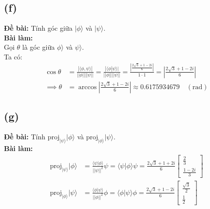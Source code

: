 \subsection{(f)}
\textbf{Đề bài:} Tính góc giữa $|\phi\rangle$ và $|\psi\rangle$.\\
\textbf{Bài làm:}\\
Gọi $\theta$ là góc giữa $\phi\rangle$ và $\psi\rangle$.\\
Ta có:
\begin{align*}
    \cos\theta &= \frac{|\langle\phi, \psi\rangle|}{||\phi||||\psi||}
    = \frac{|\langle\phi|\psi\rangle|}{||\phi||||\psi||}
    = \frac{\left|\frac{2\sqrt{3} + 1 - 2i}{6}\right|}{1 \cdot 1}
    = \left|\frac{2\sqrt{3} + 1 - 2i}{6}\right|\\
\implies \theta &= \arccos\left|\frac{2\sqrt{3} + 1 - 2i}{6}\right| \approx 0.6175934679 \quad (\mathrm{rad})
\end{align*}

\subsection{(g)}
\textbf{Đề bài:} Tính $\mathrm{proj}_{|\psi\rangle}|\phi\rangle$ và $\mathrm{proj}_{|\phi\rangle}|\psi\rangle$.\\
\textbf{Bài làm:}
\begin{align*}
    \mathrm{proj}_{|\psi\rangle}|\phi\rangle &= \frac{\langle\psi|\phi\rangle}{||\psi||^2} \psi = \langle\psi|\phi\rangle\psi = \frac{2\sqrt{3} + 1 + 2i}{6} \begin{bmatrix}
        \frac{2}{3} \\
        \frac{1-2i}{3}
    \end{bmatrix}\\
    \mathrm{proj}_{|\phi\rangle}|\psi\rangle &= \frac{\langle\phi|\psi\rangle}{||\phi||^2} \phi = \langle\phi|\psi\rangle\phi = \frac{2\sqrt{3} + 1 - 2i}{6} \begin{bmatrix}
        \frac{\sqrt{3}}{2} \\
        \frac{1}{2}
    \end{bmatrix}
\end{align*}

